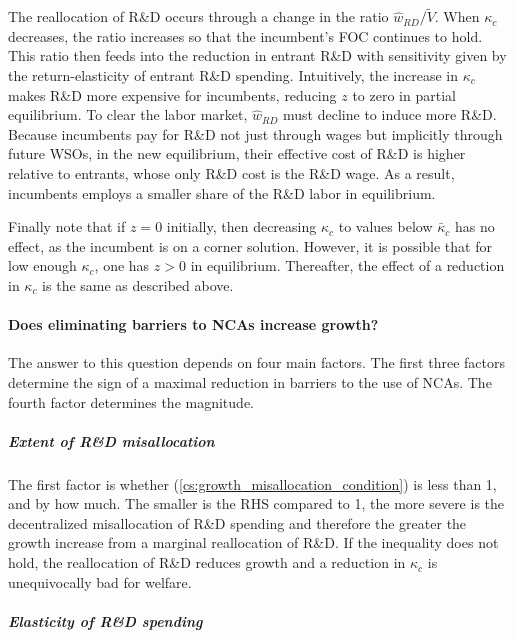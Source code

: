 \documentclass[11pt,english]{article}
\theoremstyle{definition}
\begin{document}
The reallocation of R\&D occurs through a change in the ratio $\hat{w}_{RD} / \tilde{V}$. When $\kappa_c$ decreases, the ratio increases so that the incumbent's FOC continues to hold. This ratio then feeds into the reduction in entrant R\&D with sensitivity given by the return-elasticity of entrant R\&D spending. Intuitively, the increase in $\kappa_c$ makes R\&D more expensive for incumbents, reducing $z$ to zero in partial equilibrium. To clear the labor market, $\hat{w}_{RD}$ must decline to induce more R\&D. Because incumbents pay for R\&D not just through wages but implicitly through future WSOs, in the new equilibrium, their effective cost of R\&D is higher relative to entrants, whose only R\&D cost is the R\&D wage. As a result, incumbents employs a smaller share of the R\&D labor in equilibrium.

Finally note that if $z = 0$ initially, then decreasing $\kappa_{c}$ to values below $\bar{\kappa}_c$ has no effect, as the incumbent is on a corner solution. However, it is possible that for low enough $\kappa_c$, one has $z > 0$ in equilibrium. Thereafter, the effect of a reduction in $\kappa_c$ is the same as described above.

\paragraph{Does eliminating barriers to NCAs increase growth?}

The answer to this question depends on four main factors. The first three factors determine the sign of a maximal reduction in barriers to the use of NCAs. The fourth factor determines the magnitude.

\subparagraph{Extent of R\&D misallocation} The first factor is whether (\ref{cs:growth_misallocation_condition}) is less than 1, and by how much. The smaller is the RHS compared to 1, the more severe is the decentralized misallocation of R\&D spending and therefore the greater the growth increase from a marginal reallocation of R\&D. If the inequality does not hold, the reallocation of R\&D reduces growth and a reduction in $\kappa_c$ is unequivocally bad for welfare. 

\subparagraph{Elasticity of R\&D spending}
\end{document}
